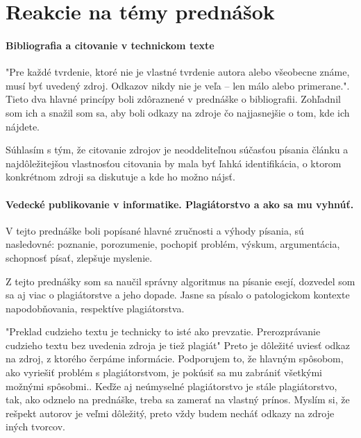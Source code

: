 \documentclass[10pt,twoside,slovak,a4paper]{article}
\begin{document}
\section{Reakcie na témy prednášok} \label{reakcie}

\paragraph{Bibliografia a citovanie v technickom texte} \label{bibliografia a citovanie}

"Pre každé tvrdenie, ktoré nie je vlastné tvrdenie autora alebo všeobecne známe, musí byť uvedený zdroj. Odkazov nikdy nie je veľa – len málo alebo primerane."\cite{bibliografia}.
Tieto dva hlavné princípy boli zdôraznené v prednáške o bibliografii. Zohľadnil som ich a snažil som sa, aby boli odkazy na zdroje čo najjasnejšie o tom, kde ich nájdete.

Súhlasím s tým, že citovanie zdrojov je neoddeliteľnou súčasťou písania článku a najdôležitejšou vlastnosťou citovania by mala byť ľahká identifikácia, o ktorom konkrétnom zdroji sa diskutuje a kde ho možno nájsť.

\paragraph {Vedecké publikovanie v informatike. Plagiátorstvo a ako sa mu vyhnúť.} \label{publikovanie a plagiatorstvo}

V tejto prednáške boli popísané hlavné zručnosti a výhody písania, sú nasledovné: poznanie, porozumenie, pochopiť problém, výskum, argumentácia, schopnosť písať, zlepšuje myslenie.\cite{plagiatorstvo}

Z tejto prednášky som sa naučil správny algoritmus na písanie esejí, dozvedel som sa aj viac o plagiátorstve a jeho dopade. Jasne sa písalo o patologickom kontexte napodobňovania, respektíve plagiátorstva.

"Preklad cudzieho textu je technicky to isté ako prevzatie. Prerozprávanie cudzieho textu bez uvedenia zdroja je tiež plagiát" \cite{plagiatorstvo} Preto je dôležité uviesť odkaz na zdroj, z ktorého čerpáme informácie.
Podporujem to, že hlavným spôsobom, ako vyriešiť problém s plagiátorstvom, je pokúsiť sa mu zabrániť všetkými možnými spôsobmi.\cite{plagiatorstvo}. Keďže aj neúmyselné plagiátorstvo je stále plagiátorstvo\cite{plagiatorstvo}, tak, ako odznelo na prednáške, treba sa zamerať na vlastný prínos. 
Myslím si, že rešpekt autorov je veľmi dôležitý, preto vždy budem necháť odkazy na zdroje iných tvorcov.
\end{document}
